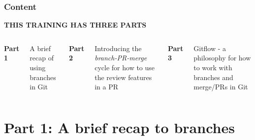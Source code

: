 \documentclass[aspectratio=169]{beamer} %
\begin{document}
\begin{frame}
	\frametitle{Content}

	\Large\centering \textbf{THIS TRAINING HAS THREE PARTS}

	\vspace{1.2em}

	\raggedright
	\begin{columns}[T]

			\large \textbf{Part 1}
			
			\vspace{1em}
			\raggedright
			\normalfont A brief recap of using branches in Git

			\large \textbf{Part 2}
			
			\vspace{1em}
			\raggedright
			\normalfont Introducing the \textit{branch-PR-merge} cycle for how to use the review features in a PR
			
			\large \textbf{Part 3}
			
			\vspace{1em}
			\raggedright
			\normalfont Gitflow - a philosophy for how to work with branches and merge/PRs in Git
		

	\end{columns}
\end{frame}

\section{Part 1: \newline A brief recap to branches}
\end{document}
